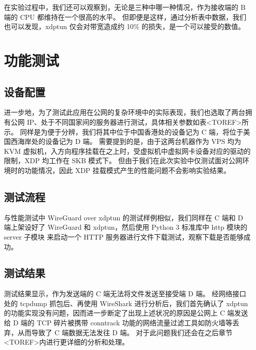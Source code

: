 在实验过程中，我们还可以观察到，无论是三种中哪一种情况，作为接收端的 B 端的 CPU 都维持在一个很高的水平。
但即便是这样，通过分析表中数据，我们也可以发现，xdptun 仅会对带宽造成约 10\% 的损失，是一个可以接受的数值。

\section{功能测试}

\subsection{设备配置}

进一步地，为了测试此应用在公网的复杂环境中的实际表现，我们也选取了两台拥有公网 IP、处于不同国家间的服务器进行测试，具体相关参数如表<TOREF>所示。
同样是为便于分辨，我们将其中位于中国香港处的设备记为 C 端，将位于美国西海岸处的设备记为 D 端。
需要提到的是，由于这两台机器作为 VPS 均为 KVM 虚拟机，入方向程序挂载在之上时，受虚拟机中虚拟网卡设备对应的驱动的限制，XDP 均工作在 SKB 模式下。
但由于我们在此次实验中仅测试面对公网环境时的功能情况，因此 XDP 挂载模式产生的性能问题不会影响实验结果。

\subsection{测试流程}

与性能测试中 WireGuard over xdptun 的测试样例相似，我们同样在 C 端和 D 端上架设好了 WireGuard 和 xdptun，然后使用 Python 3 标准库中 http 模块的 server 子模块 来启动一个 HTTP 服务器进行文件下载测试，观察下载是否能够成功。

\subsection{测试结果}

测试结果显示，作为发送端的 C 端无法将文件发送至接受端 D 端。
经网络接口处的 tcpdump 抓包后、再使用 WireShark 进行分析后，我们首先确认了 xdptun 的功能实现没有问题，因而进一步断定了出现上述状况的原因是公网上 C 端发送给 D 端的 TCP 碎片被携带 conntrack 功能的网络流量过滤工具如防火墙等丢弃，从而导致了 C 端数据无法发往 D 端。
对于此问题我们还会在之后章节<TOREF>内进行更详细的分析和处理。
